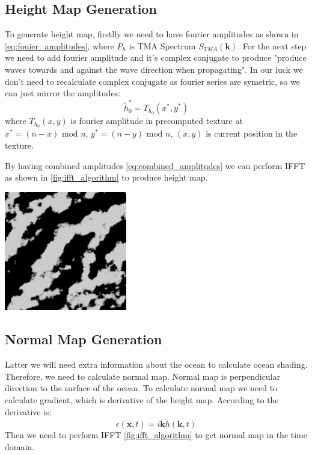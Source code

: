 \subsection{Height Map Generation}

To generate height map, firstlly we need to have fourier amplitudes as shown in \ref{eq:fouier_amplitudes}, where $P_h$ is TMA Spectrum $S_{TMA}(\mathbf{k})$.
For the next step we need to add fourier amplitude and it's complex conjugate to produce "produce waves towards and against the wave direction when propagating"\cite{horvath2015}.
In our luck we don't need to recalculate complex conjugate as fourier series are symetric, so we can just mirror the amplitudes:
\begin{equation}
    \tilde{h}^{*}_0 = T_{h_0}(x^{*}, y^{*})
\end{equation}
where $T_{h_0}(x, y)$ is fourier amplitude in precomputed texture at $x^{*} = (n - x) \text{ mod } n$, $y^{*} = (n - y) \text{ mod } n$, $(x, y)$ is current position in the texture.

By having combined amplitudes \ref{eq:combined_amplitudes} we can perform IFFT as shown in \ref{fig:ifft_algorithm} to produce height map.
\begin{minipage}{1\textwidth}
    \centering
    \includegraphics[width=0.40\textwidth]{"images/tma_height.png"}
    \label{fig:tma_height_map}
\end{minipage}

\subsection{Normal Map Generation}
Latter we will need extra information about the ocean to calculate ocean shading. Therefore, we need to calculate normal map. Normal map is perpendicular direction to the surface of the ocean.
To calculate normal map we need to calculate gradient, which is derivative of the height map. According to \cite{tessendorf2004} the derivative is:
\begin{equation}
    \epsilon(\textbf{x}, t) = i\textbf{k} \tilde{h}(\textbf{k}, t)
\end{equation}
Then we need to perform IFFT \ref{fig:ifft_algorithm} to get normal map in the time domain.

